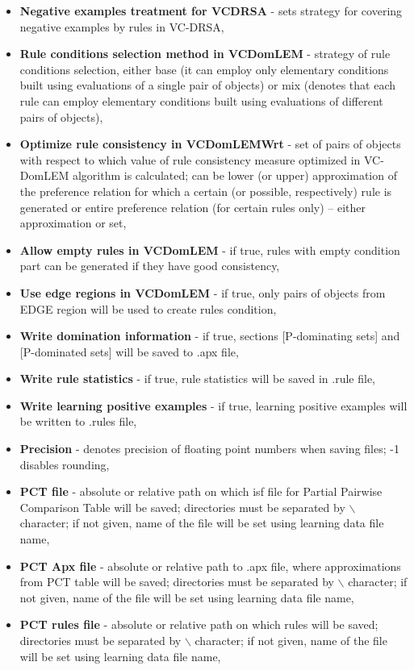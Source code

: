 \begin{itemize}
	\item \textbf{Negative examples treatment for VCDRSA} - sets strategy for covering negative examples by rules in VC-DRSA,
	\item \textbf{Rule conditions selection method in VCDomLEM} - strategy of rule conditions selection, either base (it can employ only elementary conditions built using evaluations of a single pair of objects) or mix (denotes that each rule can employ elementary conditions built using evaluations of different pairs of objects),
	\item \textbf{Optimize rule consistency in VCDomLEMWrt} - set of pairs of objects with respect to which value of rule consistency measure optimized in VC-DomLEM algorithm is calculated; can be lower (or upper) approximation of the preference relation for which a certain (or possible, respectively) rule is generated or entire preference relation (for certain rules only) – either approximation or set,
	\item \textbf{Allow empty rules in VCDomLEM} - if true, rules with empty condition part can be generated if they have good consistency,
	\item \textbf{Use edge regions in VCDomLEM} - if true, only pairs of objects from EDGE region will be used to create rules condition,
	\item \textbf{Write domination information} - if true, sections [P-dominating sets] and [P-dominated sets] will be saved to .apx file,
	\item \textbf{Write rule statistics} - if true, rule statistics will be saved in .rule file,
	\item \textbf{Write learning positive examples} - if true, learning positive examples will be written to .rules file,
	\item \textbf{Precision} - denotes precision of floating point numbers when saving files; -1 disables rounding,
	\item \textbf{PCT file} - absolute or relative path on which isf file for Partial Pairwise Comparison Table will be saved; directories must be separated by $\backslash$ character; if not given, name of the file will be set using learning data file name,
	\item \textbf{PCT Apx file} - absolute or relative path to .apx file, where approximations from PCT table will be saved; directories must be separated by $\backslash$ character; if not given, name of the file will be set using learning data file name,
	\item \textbf{PCT rules file} - absolute or relative path on which rules will be saved; directories must be separated by $\backslash$ character; if not given, name of the file will be set using learning data file name,

\end{itemize}
